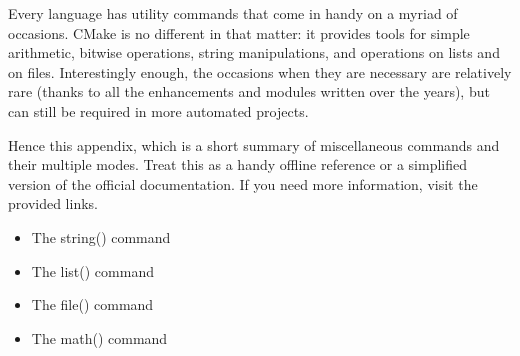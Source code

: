 Every language has utility commands that come in handy on a myriad of occasions. CMake is no different in that matter: it provides tools for simple arithmetic, bitwise operations, string manipulations, and operations on lists and on files. Interestingly enough, the occasions when they are necessary are relatively rare (thanks to all the enhancements and modules written over the years), but can still be required in more automated projects.

Hence this appendix, which is a short summary of miscellaneous commands and their multiple modes. Treat this as a handy offline reference or a simplified version of the official documentation. If you need more information, visit the provided links.

\begin{itemize}
\item 
The string() command

\item 
The list() command

\item 
The file() command

\item 
The math() command
\end{itemize}



















